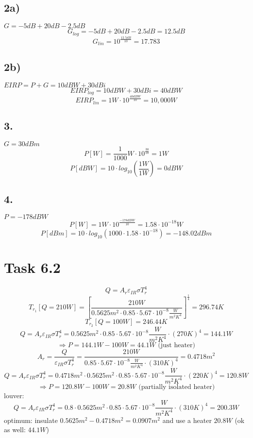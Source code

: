 \documentclass[a4paper,12pt]{article}
\begin{document}
\subsection*{2a)}
$G = -5dB +20dB -2.5dB$ \[G_{log} = -5dB +20dB -2.5dB = 12.5dB\] \[G_{lin} = 10^{\frac{12.5dB}{10}} = 17.783\]

\subsection*{2b)}
$EIRP = P + G = 10dBW + 30dBi$ \[EIRP_{log} = 10dBW + 30dBi = 40dBW\] \[EIRP_{lin} = 1W \cdot 10^{\frac{40dBW}{10}} = 10,000W\]

\subsection*{3.}
$G = 30dBm$ \[P[W] = \frac{1}{1000}W\cdot 10^{\frac{30}{10}} = 1W\] \[P[dBW] = 10\cdot log_{10}\left(\frac{1W}{1W} \right) = 0dBW\]

\subsection*{4.}
$P = -178dBW$ \[P[W] = 1W\cdot 10^{\frac{-178dBW}{10}} = 1.58\cdot 10^{-18}W\] \[P[dBm] = 10\cdot log_{10}(1000\cdot 1.58\cdot 10^{-18}) = -148.02dBm\]

\section*{Task 6.2}
\[Q = A_r \varepsilon_{IR} \sigma T_r^4\]
\[T_{r_1}[Q=210W] = \left[\frac{210W}{0.5625m^2\cdot 0.85\cdot 5.67\cdot 10^{-8}\frac{W}{m^2K^4}} \right]^\frac{1}{4} = 296.74K\]
\[T_{r_2}[Q=100W] = 246.44K\]
\[Q = A_r \varepsilon_{IR} \sigma T_r^4 = 0.5625m^2\cdot 0.85\cdot 5.67\cdot 10^{-8}\frac{W}{m^2K^4}\cdot (270K)^4 = 144.1W\]
\[\Rightarrow P = 144.1W-100W = 44.1W \text{ (just heater)}\]
\[A_r = \frac{Q}{\varepsilon_{IR}\sigma T_r^4} = \frac{210W}{0.85\cdot 5.67\cdot 10^{-8}\frac{W}{m^2K^4} \cdot (310K)^4} = 0.4718m^2\]
\[Q = A_r \varepsilon_{IR} \sigma T_r^4 = 0.4718m^2 \cdot 0.5625m^2\cdot 0.85\cdot 5.67\cdot 10^{-8}\frac{W}{m^2K^4}\cdot (220K)^4 = 120.8W\]
\[\Rightarrow P = 120.8W-100W = 20.8W \text{ (partially isolated heater)}\]
louver: 
\[Q = A_r \varepsilon_{IR} \sigma T_r^4 = 0.8\cdot 0.5625m^2\cdot 0.85\cdot 5.67\cdot 10^{-8}\frac{W}{m^2K^4}\cdot (310K)^4 = 200.3W\]
optimum: insulate $0.5625m^2 - 0.4718m^2 = 0.0907m^2$ and use a heater $20.8W$ (ok as well: $44.1W$)
\end{document}
